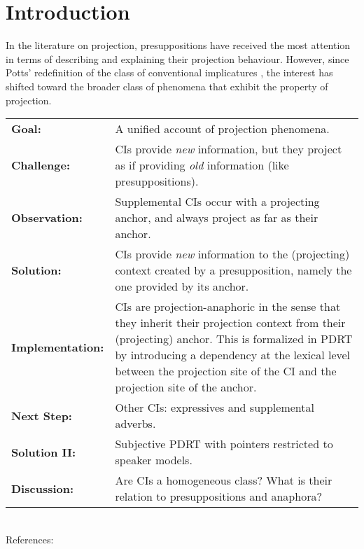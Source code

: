 \section{Introduction}\label{Introduction}

In the literature on projection, presuppositions have received the most
attention in terms of describing and explaining their projection behaviour.
However, since Potts' redefinition of the class of conventional implicatures
\citep{potts2003logic,potts2005logic}, the interest has shifted toward the
broader class of phenomena that exhibit the property of projection.

\bigskip
\begin{tabular}{p{} p{}}
          \textbf{Goal:} & A unified account of projection phenomena.\\
     \textbf{Challenge:} & CIs provide \textit{new} information, but they
                           project as if providing \textit{old} information
                           (like presuppositions).\\
   \textbf{Observation:} & Supplemental CIs occur with a projecting anchor,
                           and always project as far as their anchor.\\
      \textbf{Solution:} & CIs provide \textit{new} information to the
                           (projecting) context created by a presupposition,
                           namely the one provided by its anchor.\\
\textbf{Implementation:} & CIs are projection-anaphoric in the sense that
                           they inherit their projection context from their
                           (projecting) anchor. This is formalized in PDRT
                           \citep{venhuizen2013iwcs} by introducing a
                           dependency at the lexical level between the
                           projection site of the CI and the projection site
                           of the anchor.\\
     \textbf{Next Step:} & Other CIs: expressives and supplemental adverbs.\\
   \textbf{Solution II:} & Subjective PDRT with pointers restricted to speaker
                           models.\\
    \textbf{Discussion:} & Are CIs a homogeneous class? What is their relation
                           to presuppositions and anaphora?\\
\end{tabular}\\

References: \citep{delgobbo2003appositives,potts2005logic,amaral2007review,
  nouwen2007appositives,harris2009perspective,heringa2012appositional,
  schlenker2013supplements,nouwen2014note,potts2013presupposition}





